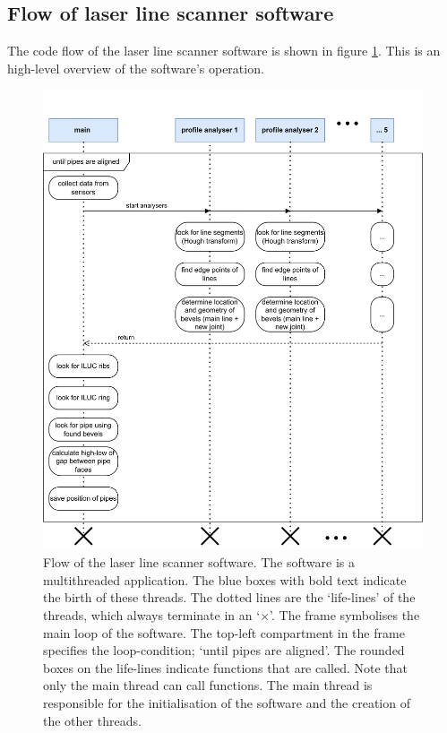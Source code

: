 \subsection{Flow of laser line scanner software} \label{ssec:code_flow}
The code flow of the laser line scanner software is shown in figure \ref{fig:code_flow}. This is an high-level
overview of the software's operation.
\begin{figure}[H]
    \centering
    \includegraphics[width=\textwidth]{images/automated_lineup_flow.png}
    \caption{Flow of the laser line scanner software. The software is a multithreaded application. The blue boxes
        with bold text indicate the birth of these threads. The dotted lines are the `life-lines' of the threads, which always terminate in an
        `$\times$'. The frame symbolises the main loop of the software. The top-left compartment in the frame
        specifies the loop-condition; `until pipes are aligned'. The rounded boxes on the life-lines indicate functions that are called. Note that only
        the main thread can call functions. The main thread is responsible for the initialisation of the software and the creation of the other threads.}
    \label{fig:code_flow}
\end{figure}
